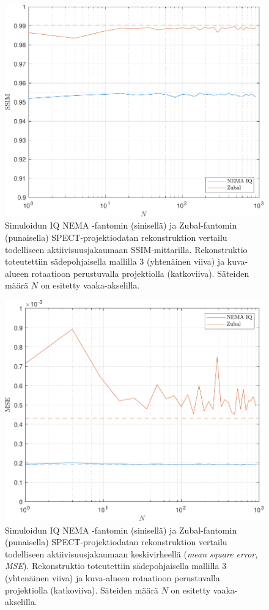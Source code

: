 \begin{figure}[H]
    \centering
    \captionsetup{width=.9\linewidth}
    \includegraphics[width=.9\linewidth]{kuvat/vertailu_SSIM.pdf}
    \caption{Simuloidun IQ NEMA -fantomin (sinisellä) ja Zubal-fantomin (punaisella) SPECT-projektiodatan rekonstruktion vertailu todelliseen aktiivisuusjakaumaan SSIM-mittarilla. Rekonstruktio toteutettiin sädepohjaisella mallilla 3 (yhtenäinen viiva) ja kuva-alueen rotaatioon perustuvalla projektiolla (katkoviiva). Säteiden määrä $N$ on esitetty vaaka-akselilla.}
    \label{fig:vertailu_SSIM}
\end{figure}
\begin{figure}[H]
    \centering
    \captionsetup{width=.9\linewidth}
    \includegraphics[width=.9\linewidth]{kuvat/vertailu_MSE.pdf}
    \caption{Simuloidun IQ NEMA -fantomin (sinisellä) ja Zubal-fantomin (punaisella) SPECT-projektiodatan rekonstruktion vertailu todelliseen aktiivisuusjakaumaan keskivirheellä (\textit{mean square error, MSE}). Rekonstruktio toteutettiin sädepohjaisella mallilla 3 (yhtenäinen viiva) ja kuva-alueen rotaatioon perustuvalla projektiolla (katkoviiva). Säteiden määrä $N$ on esitetty vaaka-akselilla.}
    \label{fig:vertailu_MSE}
\end{figure}

